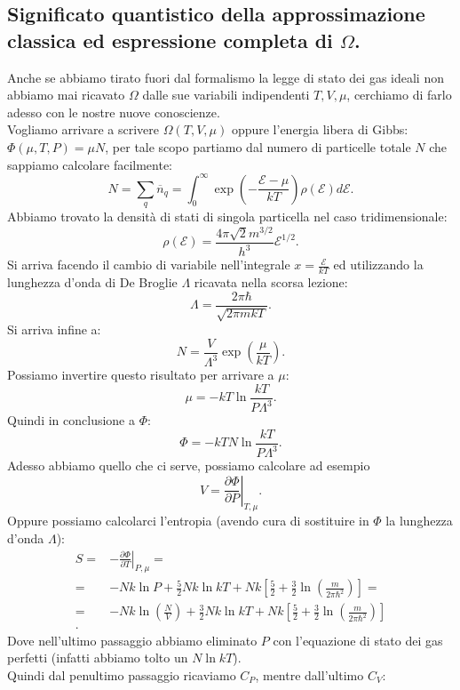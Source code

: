\subsection{Significato quantistico della approssimazione classica ed espressione completa di $\Omega $.}%
Anche se abbiamo tirato fuori dal formalismo la legge di stato dei gas ideali non abbiamo mai ricavato $\Omega $ dalle sue variabili indipendenti $T,V,\mu $, cerchiamo di farlo adesso con le nostre nuove conoscienze.\\
Vogliamo arrivare a scrivere $\Omega ( T, V , \mu ) $ oppure l'energia libera di Gibbs: $\Phi ( \mu , T,P) = \mu  N$, per tale scopo partiamo dal numero di particelle totale $N$ che sappiamo calcolare facilmente:
\[
	N = \sum_{q}^{} \overline{n}_{q}= \int_{0}^{\infty} \exp\left( - \frac{\mathcal{E} -\mu }{kT} \right) \rho ( \mathcal{E} ) d\mathcal{E} 
.\] 
Abbiamo trovato la densità di stati di singola particella nel caso tridimensionale:
\[
	\rho ( \mathcal{E} ) = \frac{4\pi \sqrt{2} m  ^{3 /2}}{h^3} \mathcal{E} ^{1 /2} 
.\] 
Si arriva facendo il cambio di variabile nell'integrale $x = \frac{\mathcal{E} }{kT}$ ed utilizzando la lunghezza d'onda di De Broglie $\Lambda$ ricavata nella scorsa lezione:
\[
	\Lambda = \frac{2\pi \hbar }{\sqrt{2\pi mkT} }
.\] 
Si arriva infine a:
\[
	N = \frac{V}{\Lambda ^3} \exp\left( \frac{\mu }{kT} \right)  
.\]
Possiamo invertire questo risultato per arrivare a $\mu $:
\[
	\mu = -kT \ln \frac{kT}{P\Lambda ^3} \label{eq:mu_classico}
.\] 
Quindi in conclusione a $\Phi $:
\[
	\Phi = -kT N \ln \frac{kT}{P\Lambda ^3}
.\] 
Adesso abbiamo quello che ci serve, possiamo calcolare ad esempio
\[
	V = \left.\frac{\partial \Phi }{\partial P} \right|_{T,\mu }
.\] 
Oppure possiamo calcolarci l'entropia (avendo cura di sostituire in $\Phi $ la lunghezza d'onda $\Lambda $):
\begin{align}
	S =& -\left.\frac{\partial \Phi }{\partial T} \right|_{P, \mu }=\\
		=& -Nk\ln P + \frac{5}{2}Nk \ln kT + Nk\left[ \frac{5}{2}+ \frac{3}{2}\ln \left( \frac{m}{2\pi \hbar^2} \right)  \right] =\\
		=&-Nk \ln \left( \frac{N}{V} \right) + \frac{3}{2} Nk \ln kT +Nk \left[ \frac{5}{2}+ \frac{3}{2} \ln\left( \frac{m}{2\pi \hbar ^2} \right)  \right] \\
.\end{align} 
Dove nell'ultimo passaggio abbiamo eliminato $P$ con l'equazione di stato dei gas perfetti (infatti abbiamo tolto un $N\ln kT$).\\ 
Quindi dal penultimo passaggio ricaviamo $C_{P}$, mentre dall'ultimo $C_{V}$:
